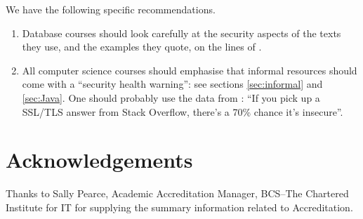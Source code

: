 \documentclass[conference]{IEEEtran}
\begin{document}
We have the following specific recommendations.
\begin{enumerate}
\item Database courses should look carefully at the security aspects of the texts they use, and the examples they quote, on the lines of \cite{Drop2019}.
\item All computer science courses should emphasise that informal resources should come with a ``security health warning'': see sections \ref{sec:informal} and \ref{sec:Java}. One should probably use the data from \cite{Chenetal2019a}: ``If you pick up a SSL/TLS answer from Stack Overflow, there's a 70\% chance it's insecure''.
\end{enumerate}

\section*{Acknowledgements}
Thanks to Sally Pearce, Academic Accreditation Manager, BCS--The
Chartered Institute for IT for supplying the summary information
related to Accreditation.


 
\end{document}
